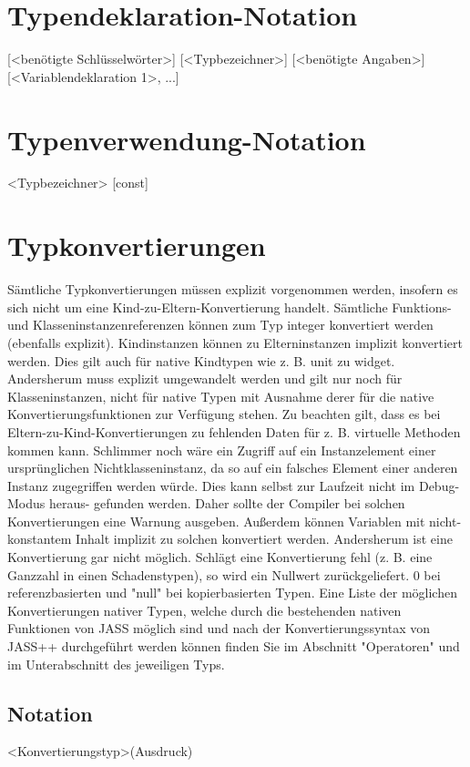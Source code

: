 \section{Typendeklaration-Notation}
[<benötigte Schlüsselwörter>] [<Typbezeichner>] [<benötigte Angaben>] [<Variablendeklaration 1>, ...]

\section{Typenverwendung-Notation}
<Typbezeichner> [const]

\section{Typkonvertierungen}
Sämtliche Typkonvertierungen müssen explizit vorgenommen werden, insofern es sich nicht
um eine Kind-zu-Eltern-Konvertierung handelt. Sämtliche Funktions- und
Klasseninstanzenreferenzen können zum Typ integer konvertiert werden (ebenfalls explizit).
Kindinstanzen können zu Elterninstanzen implizit konvertiert werden. Dies gilt auch für
native Kindtypen wie z. B. unit zu widget.
Andersherum muss explizit umgewandelt werden und gilt nur noch für Klasseninstanzen, nicht für
native Typen mit Ausnahme derer für die native Konvertierungsfunktionen zur Verfügung stehen.
Zu beachten gilt, dass es bei Eltern-zu-Kind-Konvertierungen zu fehlenden Daten für z. B.
virtuelle Methoden kommen kann. Schlimmer noch wäre ein Zugriff auf ein Instanzelement
einer ursprünglichen Nichtklasseninstanz, da so auf ein falsches Element einer anderen
Instanz zugegriffen werden würde. Dies kann selbst zur Laufzeit nicht im Debug-Modus heraus-
gefunden werden.
Daher sollte der Compiler bei solchen Konvertierungen eine Warnung ausgeben.
Außerdem können Variablen mit nicht-konstantem Inhalt implizit zu solchen konvertiert werden.
Andersherum ist eine Konvertierung gar nicht möglich.
Schlägt eine Konvertierung fehl (z. B. eine Ganzzahl in einen Schadenstypen), so wird ein Nullwert
zurückgeliefert. 0 bei referenzbasierten und "null" bei kopierbasierten Typen.
Eine Liste der möglichen Konvertierungen nativer Typen, welche durch die bestehenden nativen Funktionen
von JASS möglich sind und nach der Konvertierungssyntax von JASS++ durchgeführt werden können finden
Sie im Abschnitt "Operatoren" und im Unterabschnitt des jeweiligen Typs.

\subsection{Notation}
<Konvertierungstyp>(Ausdruck)

